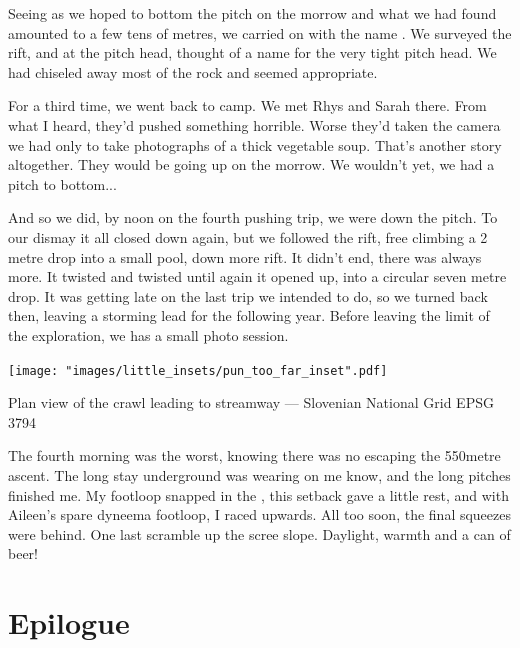 Seeing as we hoped to bottom the pitch on the morrow and what we had found amounted to a few tens of metres, we carried on with the name . We surveyed the rift, and at the pitch head, thought of a name for the very tight pitch head. We had chiseled away most of the rock and  seemed appropriate.

For a third time, we went back to camp. We met Rhys and Sarah there. From what I heard, they'd pushed something horrible. Worse they'd taken the camera we had only to take photographs of a thick vegetable soup. That's another story altogether. They would be going up on the morrow. We wouldn't yet, we had a pitch to bottom...

And so we did, by noon on the fourth pushing trip, we were down the pitch. To our dismay it all closed down again, but we followed the rift, free climbing a 2 metre drop into a small pool, down more rift. It didn't end, there was always more. It twisted and twisted until again it opened up, into a circular seven metre drop. It was getting late on the last trip we intended to do, so we turned back then, leaving a storming lead for the following year. Before leaving the limit of the exploration, we has a small photo session.


\begin{marginsurvey}
	\texttt{[image: "images/little\_insets/pun\_too\_far\_inset".pdf]}
	\caption[A Pun Too Far]{Plan view of the \protect{} crawl leading to  \protect{} streamway --- Slovenian National Grid EPSG 3794}
\end{marginsurvey}

The fourth morning was the worst, knowing there was no escaping the 550metre ascent. The long stay underground was wearing on me know, and the long pitches finished me. My footloop snapped in the , this setback gave a little rest, and with Aileen's spare dyneema footloop, I raced upwards. All too soon, the final squeezes were behind. One last scramble up the scree slope. Daylight, warmth and a can of beer!
\mydelimiter
\newpage
\section{Epilogue}

